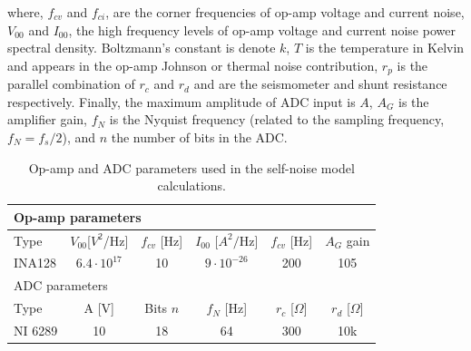 where, $f_{cv}$ and $f_{ci}$, are the corner frequencies of op-amp voltage and current noise, $V_{00}$ and $I_{00}$, the high frequency levels of op-amp voltage and current noise power spectral density. Boltzmann's constant is denote $k$, $T$ is the temperature in Kelvin and appears in the op-amp Johnson or thermal noise contribution, $r_p$ is the parallel combination of $r_c$ and $r_d$ and are the seismometer and shunt resistance respectively. Finally, the maximum amplitude of ADC input is $A$, $A_G$ is the amplifier gain, $f_N$ is the Nyquist frequency (related to the sampling frequency, $f_N = f_s/2$), and $n$ the number of bits in the ADC. 

\begin{table}[h]
\center
\begin{tabular}{| l | c | c | c | c | c |}
\hline
\multicolumn{6}{|l|}{Op-amp parameters} \\
\hline
Type & $V_{00}$[$V^2$/Hz] & $f_{cv}$ [Hz] & $I_{00}$ [$A^2/$Hz] &$f_{cv}$ [Hz] & $A_G$ gain \\
\hline
INA128  &	$6.4 \cdot 10^{17} $& 10 & $9 \cdot 10^{-26} $ & 200 & 105 \\
\hline
\multicolumn{6}{|l|}{ADC parameters} \\
\hline
Type & A [V] & Bits $n$ & $f_N$ [Hz] & $r_c$ [$\Omega$] & $r_d$ [$\Omega$] \\
\hline
NI 6289 & 10 & 18 & 64 & 300 & 10k \\
\hline
\end{tabular}
\caption{Op-amp and ADC parameters used in the self-noise model calculations. }
\label{tab:ampnoise}
\end{table}


